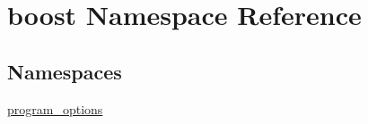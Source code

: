 \hypertarget{namespaceboost}{}\section{boost Namespace Reference}
\label{namespaceboost}
\subsection*{Namespaces}
\begin{DoxyCompactItemize}
\item 
 \mbox{\hyperlink{namespaceboost_1_1program__options}{program\+\_\+options}}
\end{DoxyCompactItemize}
